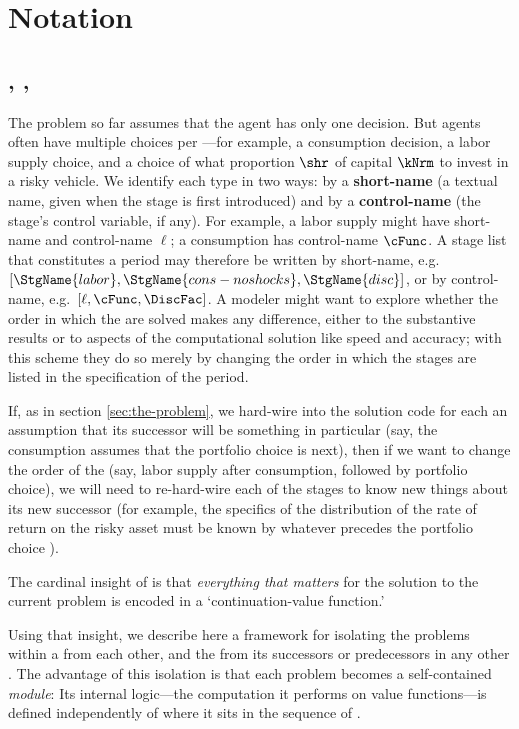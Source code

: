 \documentclass[SolvingMicroDSOPs]{subfiles}
\begin{document}
\hypertarget{notation}{}
\section{Notation}\label{sec:notation}

\hypertarget{intervals-stages-perches}{}
\subsection{\Intervals, \Stgs, \Prchs}

The problem so far assumes that the agent has only one decision.  But agents often have multiple choices per {\interval}---for example, a consumption decision, a labor supply choice, and a choice of what proportion $\shr$ of capital $\kNrm$ to invest in a risky vehicle.  We identify each {\stg} type in two ways: by a \textbf{short-name} (a textual name, given when the stage is first introduced) and by a \textbf{control-name} (the stage's control variable, if any).  For example, a labor supply {\stg} might have short-name  and control-name $\ell$; a consumption {\stg} has control-name $\cFunc$.  A stage list that constitutes a period may therefore be written by short-name, e.g.\ $[\StgName{labor}, \StgName{cons-noshocks}, \StgName{disc}]$, or by control-name, e.g.\ $[\ell, \cFunc, \DiscFac]$. A modeler might want to explore whether the order in which the {\stgs} are solved makes any difference, either to the substantive results or to aspects of the computational solution like speed and accuracy; with this scheme they do so merely by changing the order in which the stages are listed in the specification of the period.

If, as in section \ref{sec:the-problem}, we hard-wire into the solution code for each {\stg} an assumption that its successor {\stg} will be something in particular (say, the consumption {\stg} assumes that the portfolio choice is next), then if we want to change the order of the {\stgs} (say, labor supply after consumption, followed by portfolio choice), we will need to re-hard-wire each of the stages to know new things about its new successor (for example, the specifics of the distribution of the rate of return on the risky asset must be known by whatever {\stg} precedes the portfolio choice {\stg}).

The cardinal insight of \citet{bellman1957} is that \emph{everything that matters} for the solution to the current problem is encoded in a `continuation-value function.'

Using that insight, we describe here a framework for isolating the {\stg} problems within a {\interval} from each other, and the {\interval} from its successors or predecessors in any other {\interval}.  The advantage of this isolation is that each {\stg} problem becomes a self-contained \textit{module}: Its internal logic---the computation it performs on value functions---is defined independently of where it sits in the sequence of {\stgs}.
\end{document}
